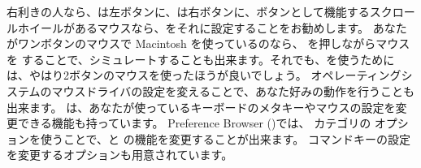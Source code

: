 \documentclass[a4paper,10pt,twoside]{book}
\begin{document}





右利きの人なら、\click は左ボタンに、\actclick は右ボタンに、ボタンとして機能するスクロールホイールがあるマウスなら、\metaclick をそれに設定することをお勧めします。
あなたがワンボタンのマウスで Macintosh を使っているのなら、\clover{} を押しながらマウスを \click することで、シミュレートすることも出来ます。それでも、\pharo を使うためには、やはり2ボタンのマウスを使ったほうが良いでしょう。
オペレーティングシステムのマウスドライバの設定を変えることで、あなた好みの動作を行うことも出来ます。
\pharo は、あなたが使っているキーボードのメタキーやマウスの設定を変更できる機能も持っています。
Preference Browser ()では、 カテゴリの  オプションを使うことで、\actclick と \metaclick の機能を変更することが出来ます。
コマンドキーの設定を変更するオプションも用意されています。
\end{document}

